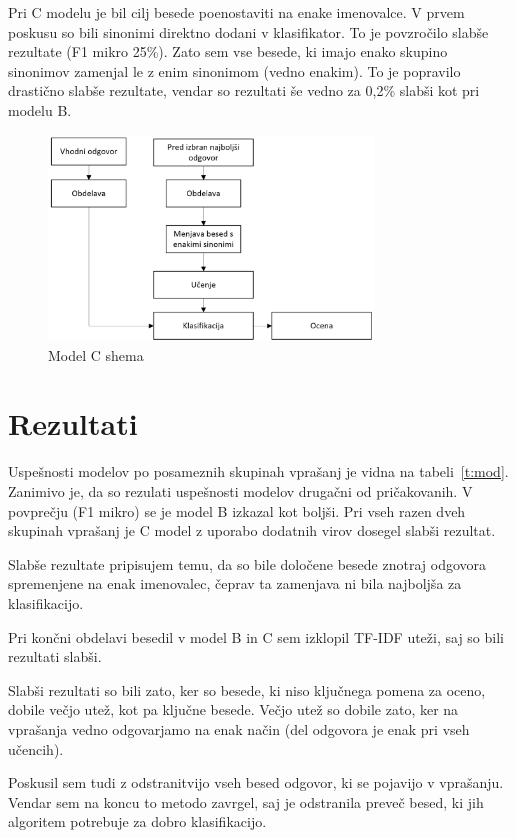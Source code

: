 \documentclass[journal]{IEEEtran}
\begin{document}
Pri C modelu je bil cilj besede poenostaviti na enake imenovalce. V prvem poskusu so bili sinonimi direktno dodani v klasifikator. To je povzročilo slabše rezultate (F1 mikro 25\%). Zato sem vse besede, ki imajo enako skupino sinonimov zamenjal le z enim sinonimom (vedno enakim). To je popravilo drastično slabše rezultate, vendar so rezultati še vedno za 0,2\% slabši kot pri modelu B.

\begin{figure}[h]
	\centering
	\includegraphics[width=3.4in]{C}
	\caption{Model C shema}
	\label{sl:mc}
\end{figure}

\section{Rezultati}
Uspešnosti modelov po posameznih skupinah vprašanj je vidna na tabeli~\ref{t:mod}. Zanimivo je, da so rezulati uspešnosti modelov drugačni od pričakovanih. V povprečju (F1 mikro) se je model B izkazal kot boljši. Pri vseh razen dveh skupinah vprašanj je C model z uporabo dodatnih virov dosegel slabši rezultat.

Slabše rezultate pripisujem temu, da so bile določene besede znotraj odgovora spremenjene na enak imenovalec, čeprav ta zamenjava ni bila najboljša za klasifikacijo.

Pri končni obdelavi besedil v model B in C sem izklopil TF-IDF uteži, saj so bili rezultati slabši. 

Slabši rezultati so bili zato, ker so besede, ki niso ključnega pomena za oceno, dobile večjo utež, kot pa ključne besede. Večjo utež so dobile zato, ker na vprašanja vedno odgovarjamo na enak način (del odgovora je enak pri vseh učencih).

Poskusil sem tudi z odstranitvijo vseh besed odgovor, ki se pojavijo v vprašanju. Vendar sem na koncu to metodo zavrgel, saj je odstranila preveč besed, ki jih algoritem potrebuje za dobro klasifikacijo.\\
\end{document}
